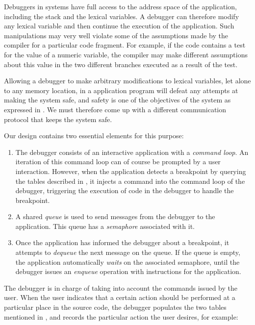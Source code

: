 Debuggers in \unix{} systems have full access to the address space of
the application, including the stack and the lexical variables.  A
\unix{} debugger can therefore modify any lexical variable and then
continue the execution of the application.  Such manipulations may
very well violate some of the assumptions made by the compiler for a
particular code fragment.  For example, if the code contains a test
for the value of a numeric variable, the compiler may make different
assumptions about this value in the two different branches executed as
a result of the test.

Allowing a debugger to make arbitrary modifications to lexical
variables, let alone to any memory location, in a \commonlisp{}
application program will defeat any attempts at making the system
safe, and safety is one of the objectives of the \sicl{} system as
expressed in .  We must therefore come up
with a different communication protocol that keeps the system safe.

Our design contains two essential elements for this purpose:

\begin{enumerate}
\item The debugger consists of an interactive application with a
  \emph{command loop}.  An iteration of this command loop can of
  course be prompted by a user interaction.  However, when the
  application detects a breakpoint by querying the tables described in
  , it injects a command into the
  command loop of the debugger, triggering the execution of code in
  the debugger to handle the breakpoint.
\item A shared \emph{queue} is used to send messages from the debugger
  to the application.  This queue has a \emph{semaphore} associated
  with it.
\item Once the application has informed the debugger about a
  breakpoint, it attempts to \emph{dequeue} the next message on the
  queue.  If the queue is empty, the application automatically
  \emph{waits} on the associated semaphore, until the debugger issues
  an \emph{enqueue} operation with instructions for the application.
\end{enumerate}

The debugger is in charge of taking into account the commands issued
by the user.  When the user indicates that a certain action should be
performed at a particular place in the source code, the debugger
populates the two tables mentioned in ,
and records the particular action the user desires, for example:

